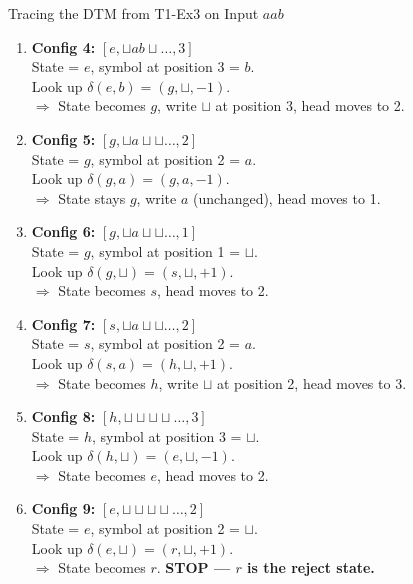 \documentclass[11pt,a4paper]{article}
\newcommand{\blank}{\sqcup}
\begin{document}
\begin{examplebox}{Tracing the DTM from T1-Ex3 on Input $aab$}
\begin{enumerate}
    \item \textbf{Config 4:} $[e, \blank ab\blank\ldots, 3]$\\
    State = $e$, symbol at position 3 = $b$.\\
    Look up $\delta(e, b) = (g, \blank, -1)$.\\
    $\Rightarrow$ State becomes $g$, write $\blank$ at position 3, head moves to 2.

    \item \textbf{Config 5:} $[g, \blank a\blank\blank\ldots, 2]$\\
    State = $g$, symbol at position 2 = $a$.\\
    Look up $\delta(g, a) = (g, a, -1)$.\\
    $\Rightarrow$ State stays $g$, write $a$ (unchanged), head moves to 1.

    \item \textbf{Config 6:} $[g, \blank a\blank\blank\ldots, 1]$\\
    State = $g$, symbol at position 1 = $\blank$.\\
    Look up $\delta(g, \blank) = (s, \blank, +1)$.\\
    $\Rightarrow$ State becomes $s$, head moves to 2.

    \item \textbf{Config 7:} $[s, \blank a\blank\blank\ldots, 2]$\\
    State = $s$, symbol at position 2 = $a$.\\
    Look up $\delta(s, a) = (h, \blank, +1)$.\\
    $\Rightarrow$ State becomes $h$, write $\blank$ at position 2, head moves to 3.

    \item \textbf{Config 8:} $[h, \blank\blank\blank\blank\ldots, 3]$\\
    State = $h$, symbol at position 3 = $\blank$.\\
    Look up $\delta(h, \blank) = (e, \blank, -1)$.\\
    $\Rightarrow$ State becomes $e$, head moves to 2.

    \item \textbf{Config 9:} $[e, \blank\blank\blank\blank\ldots, 2]$\\
    State = $e$, symbol at position 2 = $\blank$.\\
    Look up $\delta(e, \blank) = (r, \blank, +1)$.\\
    $\Rightarrow$ State becomes $r$. \textbf{STOP --- $r$ is the reject state.}
\end{enumerate}


\end{examplebox}
\end{document}
